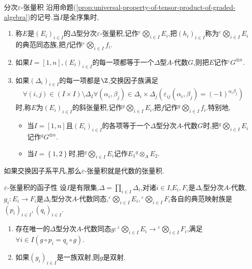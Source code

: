\begin{definition}{分次$\varepsilon$-张量积}{}
	沿用命题(\ref{prop:universal-property-of-tensor-product-of-graded-algebra})的记号.当$I$是全序集时,
	\begin{enumerate}
		\item 称$E$是$\left(E_{i}\right)_{i\in I}$的$\Delta$型分次$\varepsilon$-张量积,记作${}^{\varepsilon}\bigotimes\limits_{i\in I}E_{i}$,把$\left(h_{i}\right)_{i\in I}$称为${}^{\varepsilon}\bigotimes\limits_{i\in I}E_{i}$的典范同态族,把$f$记作${}^{\varepsilon}\bigotimes\limits_{i\in I}f_{i}$.
		\item 如果$I=\left[1,n\right]$,$\left(E_{i}\right)_{i\in I}$的每一项都等于一个$\Delta$型$A$-代数$G$,则把$E$记作${}^{\varepsilon}G^{\otimes n}$.
		\item 如果$\left(\Delta_{i}\right)_{i\in I}$的每一项都是$\Z$,交换因子族满足
		\begin{align*}
			\forall\left(i,j\right)\in\left(I\times I\right)\setminus\Delta_{I}\forall\left(\alpha_{i},\beta_{j}\right)\in\Delta_{i}\times\Delta_{j}\left(\varepsilon_{ij}\left(\alpha_{i},\beta_{j}\right)=\left(-1\right)^{\alpha_{i}\beta_{j}}\right)
		\end{align*}
		时,称$E$为$\left(E_{i}\right)_{i\in I}$的斜张量积,记作${}^{g}\bigotimes\limits_{i\in I}E_{i}$,把$f$记作${}^{g}\bigotimes\limits_{i\in I}f_{i}$.特别地,
		\begin{itemize}
			\item 当$I=\left[1,n\right]$且$\left(E_{i}\right)_{i\in I}$的各项等于一个$\Delta$型分次$A$-代数$G$时,把${}^{g}\bigotimes\limits_{i\in I}E_{i}$记作$^{g}G^{\otimes n}$.
			\item 当$I=\left\{1,2\right\}$时,把${}^{g}\bigotimes\limits_{i\in I}E_{i}$记作$E_{1}{}^{g}\otimes_{A}E_{2}$.
		\end{itemize}
	\end{enumerate}
\end{definition}

\begin{remark}{}{}
	如果交换因子系平凡,那么$\varepsilon$-张量积就是代数的张量积.
\end{remark}

\begin{corollary}{$\varepsilon$-张量积的函子性}{}
	设$I$是有限集,$\Delta=\prod\limits_{i\in I}\Delta_{i}$,对诸$i\in I$,$E_{i},F_{i}$是$\Delta_{i}$型分次$A$-代数,$g_{i}:E_{i}\to F_{i}$是$\Delta_{i}$型分次$A$-代数同态,${}^{\varepsilon}\bigotimes\limits_{i\in I}E_{i},{}^{\varepsilon}\bigotimes\limits_{i\in I}F_{i}$各自的典范映射族是$\left(p_{i}\right)_{i\in I},\left(q_{i}\right)_{i\in I}$.
	\begin{enumerate}
		\item 存在唯一的$\Delta$型分次$A$-代数同态$g:{}^{\varepsilon}\bigotimes\limits_{i\in I}E_{i}\to{}^{\varepsilon}\bigotimes\limits_{i\in I}F_{i}$,满足$\forall i\in I\left(g\circ p_{i}=q_{i}\circ g\right)$.
		\item 如果$\left(g_{i}\right)_{i\in I}$是一族双射,则$g$是双射.
	\end{enumerate}
\end{corollary}


